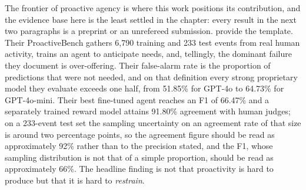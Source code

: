 The frontier of proactive agency is where this work positions its contribution,
and the evidence base here is the least settled in the chapter: every result in
the next two paragraphs is a preprint or an unrefereed submission.
\citet[a 2024 preprint]{lu_proactive_2024} provide the template. Their
ProactiveBench gathers 6,790 training and 233 test events from real human
activity, trains an agent to anticipate needs, and, tellingly, the dominant
failure they document is over-offering. Their false-alarm rate is the
proportion of predictions that were not needed, and on that definition every
strong proprietary model they evaluate exceeds one half, from 51.85\% for
GPT-4o to 64.73\% for GPT-4o-mini. Their best fine-tuned agent reaches an F1 of
66.47\% and a separately trained reward model attains 91.80\% agreement with
human judges; on a 233-event test set the sampling uncertainty on an agreement
rate of that size is around two percentage points, so the agreement figure
should be read as approximately 92\% rather than to the precision stated, and
the F1, whose sampling distribution is not that of a simple proportion, should
be read as approximately 66\%. The headline finding is not that proactivity is
hard to produce but that it is hard to \emph{restrain}.

